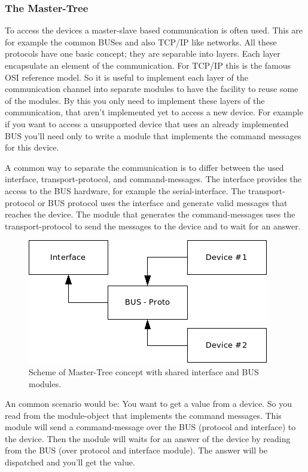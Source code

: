 \subsubsection{The Master-Tree}
To access the devices a master-slave based communication is often used. This are 
for example the common BUSes and also TCP/IP like networks. All these protocols
have one basic concept; they are separable into layers. Each layer encapsulate 
an element of the communication.  For TCP/IP this is the famous OSI reference 
model. So it is useful to implement each layer of the communication channel
into separate modules to have the facility to reuse some of the modules. By
this you only need to implement these layers of the communication, that aren't
implemented yet to access a new device. For example if you want to access
a unsupported device that uses an already implemented BUS you'll need only
to write a module that implements the command messages for this device.

A common way to separate the communication is to differ between the used
interface, transport-protocol, and command-messages. The interface provides
the access to the BUS hardware, for example the serial-interface. The 
transport-protocol or BUS protocol uses the interface and generate valid 
messages that reaches the device. The module that generates the 
command-messages uses the transport-protocol to send the messages to the
device and to wait for an answer.  

\begin{figure}[ht]
    \centering
    \label{fig:cMasterTree}
    \includegraphics[scale=1]{cMasterTree.png}
    \caption{Scheme of Master-Tree concept with shared interface and BUS modules.}
\end{figure}

An common scenario would be: You want to get a value from a device. So
you read from the module-object that implements the command messages.
This module will send a command-message over the BUS (protocol and interface)
to the device. Then the module will waits for an answer of the device
by reading from the BUS (over protocol and interface module). The
answer will be dispatched and you'll get the value.


